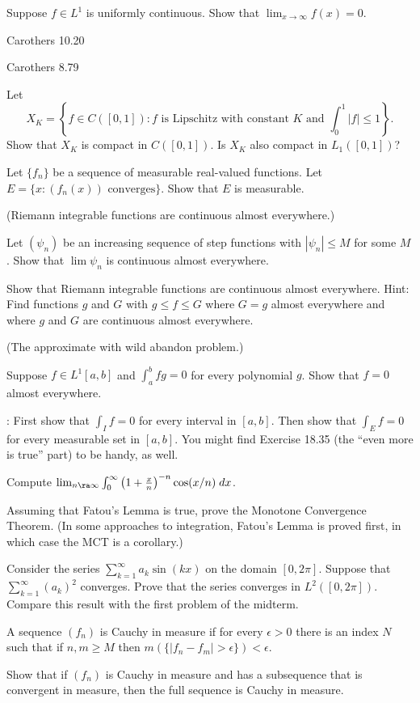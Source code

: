 \documentclass[minion]{homework}
\begin{document}
\begin{aproblems}

\hproblem Suppose $f\in L^1$ is uniformly continuous.  Show that
$\lim_{x\rightarrow\infty} f(x)=0$.


\hproblem Carothers 10.20 

\hproblem Carothers 8.79 

\hproblem Let
$$
X_K = \left\{f\in C([0,1]): \text{$f$ is Lipschitz with constant $K$ and $\int_0^1|f| \le 1$}\right\}.
$$
Show that $X_K$ is compact in $C([0,1])$.  Is $X_K$ also compact in $L_1([0,1])$?

\hproblem Let $\{f_n\}$ be a sequence of measurable real-valued functions.
Let $E=\{x: \text{$(f_n(x))$ converges}\}$.  Show that $E$ is measurable.


\hproblem (Riemann integrable functions are continuous almost everywhere.)
\begin{subproblems}
  \item Let $(\psi_n)$ be an increasing sequence of step functions with $|\psi_n|\le M$ for some $M$.  Show that $\lim \psi_n$ is continuous almost everywhere.
  \item Show that Riemann integrable functions are continuous almost everywhere.
  Hint:  Find functions $g$ and $G$ with $g\le f \le G$ where $G=g$ almost
  everywhere and where $g$ and $G$ are continuous almost everywhere.
\end{subproblems}

\hproblem (The approximate with wild abandon problem.)

Suppose $f\in L^1[a,b]$ and $\int_a^b fg=0$ for every
polynomial $g$.  Show that $f=0$ almost everywhere.

\Hint: First show that $\int_I f = 0$ for every interval in $[a,b]$.
Then show that $\int_E f=0$ for every measurable set in $[a,b]$. You might
find Exercise 18.35 (the ``even more is true'' part) to be handy, as well.

\hproblem Compute $\lim_{n\ra\infty} \int_0^\infty \left(1+\frac{x}{n}\right)^{-n}\cos(x/n)\;dx$.

\hproblem Assuming that Fatou's Lemma is true, prove the Monotone Convergence Theorem.  (In some approaches to integration, Fatou's Lemma is proved first, in which case the MCT is a corollary.)

\hproblem Consider the series $\sum_{k=1}^\infty a_k \sin(k x)$ on
the domain $[0,2\pi]$.  Suppose that $\sum_{k=1}^\infty (a_k)^2$ converges.
Prove that the series converges in $L^2([0,2\pi])$.
Compare this result with the first problem of the midterm.

\hproblem A sequence $(f_n)$ is Cauchy in measure if for every
$\epsilon>0$ there is an index $N$ such that if $n,m\ge M$ then
$m( \{|f_n-f_m|>\epsilon\} ) < \epsilon$.

Show that if $(f_n)$ is Cauchy in measure and has a subsequence
that is convergent in measure, then the full sequence is Cauchy in measure.

\end{aproblems}
\newpage
\end{document}
